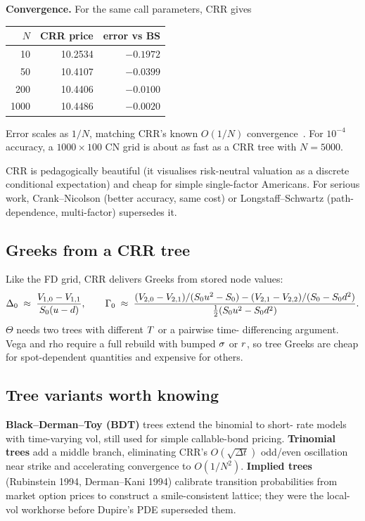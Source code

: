 \textbf{Convergence.}  For the same call parameters, CRR gives
\begin{center}
\begin{tabular}{r|rr}
\toprule
$N$ & CRR price & error vs BS \\
\midrule
10   & 10.2534 & $-0.1972$ \\
50   & 10.4107 & $-0.0399$ \\
200  & 10.4406 & $-0.0100$ \\
1000 & 10.4486 & $-0.0020$ \\
\bottomrule
\end{tabular}
\end{center}
Error scales as $1/N$, matching CRR's known $O(1/N)$
convergence~\citeHull.  For $10^{-4}$ accuracy, a $1000\times 100$
CN grid is about as fast as a CRR tree with $N=5000$.

\begin{intuitionbox}
CRR is pedagogically beautiful (it visualises risk-neutral
valuation as a discrete conditional expectation) and cheap for
simple single-factor Americans.  For serious work, Crank--Nicolson
(better accuracy, same cost) or Longstaff--Schwartz (path-dependence,
multi-factor) supersedes it.
\end{intuitionbox}

\subsection{Greeks from a CRR tree}

Like the FD grid, CRR delivers Greeks from stored node values:
\begin{equation}
  \Delta_0 \;\approx\; \frac{V_{1,0} - V_{1,1}}{S_0(u-d)},
  \qquad
  \Gamma_0 \;\approx\; \frac{(V_{2,0}-V_{2,1})/(S_0 u^2 - S_0) - (V_{2,1}-V_{2,2})/(S_0 - S_0 d^2)}{\tfrac12 (S_0 u^2 - S_0 d^2)}.
\end{equation}
$\Theta$ needs two trees with different $T$ or a pairwise time-
differencing argument.  Vega and rho require a full rebuild with
bumped $\sigma$ or $r$, so tree Greeks are cheap for spot-dependent
quantities and expensive for others.

\subsection{Tree variants worth knowing}

\textbf{Black--Derman--Toy (BDT)} trees extend the binomial to short-
rate models with time-varying vol, still used for simple callable-bond
pricing.  \textbf{Trinomial trees} add a middle branch, eliminating
CRR's $O(\sqrt{\Delta t})$ odd/even oscillation near strike and
accelerating convergence to $O(1/N^2)$.  \textbf{Implied trees}
(Rubinstein 1994, Derman--Kani 1994) calibrate transition probabilities
from market option prices to construct a smile-consistent lattice;
they were the local-vol workhorse before Dupire's PDE superseded them.


